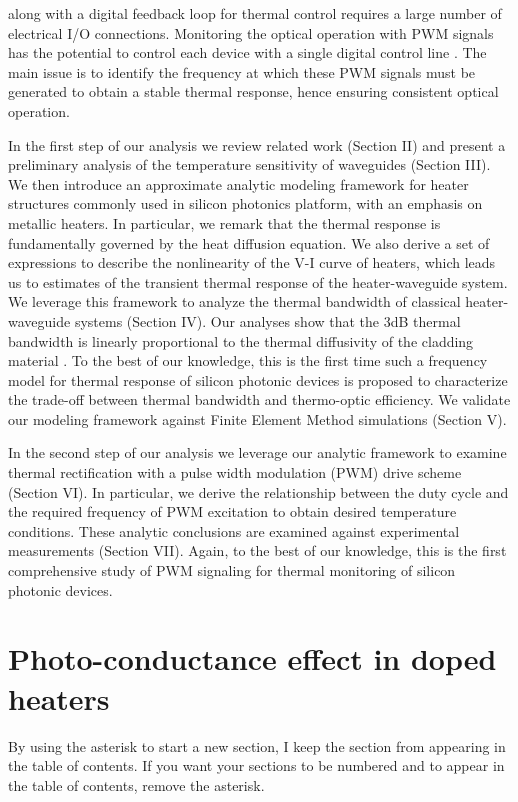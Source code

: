 along with a digital feedback loop for thermal control requires a large number of electrical I/O connections. Monitoring the optical operation with PWM signals has the potential to control each device with a single digital control line \cite{zecevic2015integrated, aguinaldo2014wideband}.  The main issue is to identify the frequency at which these PWM signals must be generated to obtain a stable thermal response, hence ensuring consistent optical operation. 


In the first step of our analysis we review related work (Section II) and present a preliminary analysis of the temperature sensitivity of waveguides (Section III). We then introduce an approximate analytic modeling framework for heater structures commonly used in silicon photonics platform, with an emphasis on metallic heaters. In particular, we remark that the thermal response is fundamentally governed by the heat diffusion equation. We also derive a set of expressions to describe the nonlinearity of the V-I curve of heaters, which leads us to estimates of the transient thermal response of the heater-waveguide system. We leverage this framework to analyze the thermal bandwidth of classical heater-waveguide systems (Section IV). Our analyses show that the 3dB thermal bandwidth is linearly proportional to the thermal diffusivity of the cladding material \cite{atabaki2010optimization}. To the best of our knowledge, this is the first time such a frequency model for thermal response of silicon photonic devices is proposed to characterize the trade-off between thermal bandwidth and thermo-optic efficiency. We validate our modeling framework against Finite Element Method simulations (Section V).


In the second step of our analysis we leverage our analytic framework to examine thermal rectification with a pulse width modulation (PWM) drive scheme (Section VI). In particular, we derive the relationship between the duty cycle and the required frequency of PWM excitation to obtain desired temperature conditions. These analytic conclusions are examined against experimental measurements (Section VII). Again, to the best of our knowledge, this is the first comprehensive study of PWM signaling for thermal monitoring of silicon photonic devices. 



\section{Photo-conductance effect in doped heaters}

By using the asterisk to start a new section, I keep the section from appearing in the table of contents.
If you want your sections to be numbered and to appear in the table of contents, remove the asterisk.
